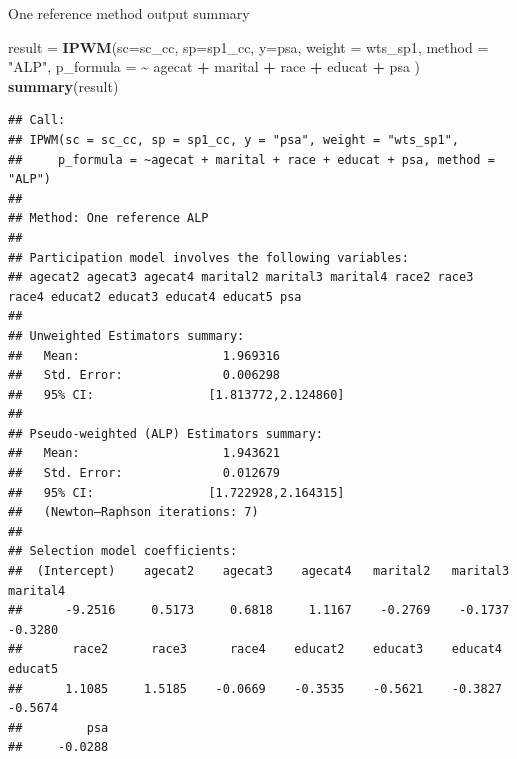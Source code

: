 \documentclass[
  ignorenonframetext,
]{beamer}
\newenvironment{Shaded}{\begin{snugshade}}{\end{snugshade}}
\newcommand{\AttributeTok}[1]{\textcolor[rgb]{0.13,0.29,0.53}{#1}}
\newcommand{\FunctionTok}[1]{\textcolor[rgb]{0.13,0.29,0.53}{\textbf{#1}}}
\newcommand{\NormalTok}[1]{#1}
\newcommand{\OtherTok}[1]{\textcolor[rgb]{0.56,0.35,0.01}{#1}}
\newcommand{\SpecialCharTok}[1]{\textcolor[rgb]{0.81,0.36,0.00}{\textbf{#1}}}
\newcommand{\StringTok}[1]{\textcolor[rgb]{0.31,0.60,0.02}{#1}}
\begin{document}
\begin{frame}[fragile]{One reference method}
\label{one-reference-method-1}
output summary

\begin{Shaded}
\begin{Highlighting}[]
\NormalTok{result }\OtherTok{=} \FunctionTok{IPWM}\NormalTok{(}\AttributeTok{sc=}\NormalTok{sc\_cc, }\AttributeTok{sp=}\NormalTok{sp1\_cc, }\AttributeTok{y=}\StringTok{\textquotesingle{}psa\textquotesingle{}}\NormalTok{, }\AttributeTok{weight =} \StringTok{\textquotesingle{}wts\_sp1\textquotesingle{}}\NormalTok{, }\AttributeTok{method =} \StringTok{"ALP"}\NormalTok{, }
              \AttributeTok{p\_formula =} \SpecialCharTok{\textasciitilde{}}\NormalTok{ agecat }\SpecialCharTok{+}\NormalTok{ marital }\SpecialCharTok{+}\NormalTok{ race }\SpecialCharTok{+}\NormalTok{ educat }\SpecialCharTok{+}\NormalTok{ psa )}
\FunctionTok{summary}\NormalTok{(result)}
\end{Highlighting}
\end{Shaded}

\begin{verbatim}
## Call:
## IPWM(sc = sc_cc, sp = sp1_cc, y = "psa", weight = "wts_sp1", 
##     p_formula = ~agecat + marital + race + educat + psa, method = "ALP")
## 
## Method: One reference ALP 
## 
## Participation model involves the following variables:
## agecat2 agecat3 agecat4 marital2 marital3 marital4 race2 race3 race4 educat2 educat3 educat4 educat5 psa 
## 
## Unweighted Estimators summary:
##   Mean:                    1.969316
##   Std. Error:              0.006298
##   95% CI:                [1.813772,2.124860]
## 
## Pseudo-weighted (ALP) Estimators summary:
##   Mean:                    1.943621
##   Std. Error:              0.012679
##   95% CI:                [1.722928,2.164315]
##   (Newton–Raphson iterations: 7)
## 
## Selection model coefficients:
##  (Intercept)    agecat2    agecat3    agecat4   marital2   marital3   marital4
##      -9.2516     0.5173     0.6818     1.1167    -0.2769    -0.1737    -0.3280
##       race2      race3      race4    educat2    educat3    educat4    educat5
##      1.1085     1.5185    -0.0669    -0.3535    -0.5621    -0.3827    -0.5674
##         psa
##     -0.0288
\end{verbatim}
\end{frame}
\end{document}
